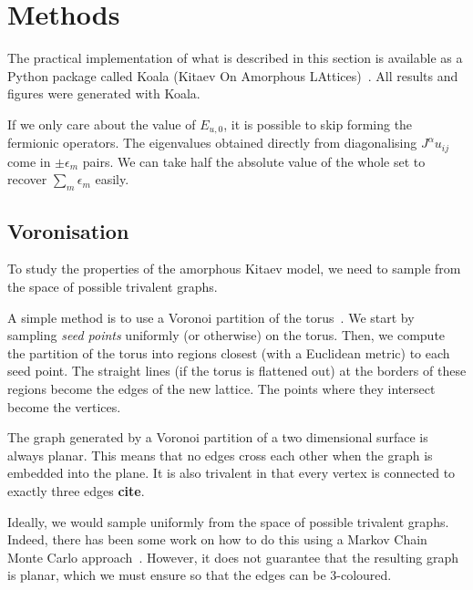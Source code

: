 \begin{lstlisting}[language=Python]
\end{lstlisting}

\hypertarget{amk-methods}{%
\section{Methods}\label{amk-methods}}

The practical implementation of what is described in this section is available as a Python package called Koala (Kitaev On Amorphous LAttices)~\autocite{hodsonKoalaKitaevAmorphous2022}. All results and figures were generated with Koala.

If we only care about the value of \(E_{u,0}\), it is possible to skip forming the fermionic operators. The eigenvalues obtained directly from diagonalising \(J^{\alpha} u_{ij}\) come in \(\pm \epsilon_m\) pairs. We can take half the absolute value of the whole set to recover \(\sum_m \epsilon_m\) easily.

\hypertarget{voronisation}{%
\subsection{Voronisation}\label{voronisation}}

To study the properties of the amorphous Kitaev model, we need to sample from the space of possible trivalent graphs.

A simple method is to use a Voronoi partition of the torus~\autocite{mitchellAmorphousTopologicalInsulators2018,marsalTopologicalWeaireThorpeModels2020,florescu_designer_2009}. We start by sampling \emph{seed points} uniformly (or otherwise) on the torus. Then, we compute the partition of the torus into regions closest (with a Euclidean metric) to each seed point. The straight lines (if the torus is flattened out) at the borders of these regions become the edges of the new lattice. The points where they intersect become the vertices.

The graph generated by a Voronoi partition of a two dimensional surface is always planar. This means that no edges cross each other when the graph is embedded into the plane. It is also trivalent in that every vertex is connected to exactly three edges \textbf{cite}.

Ideally, we would sample uniformly from the space of possible trivalent graphs. Indeed, there has been some work on how to do this using a Markov Chain Monte Carlo approach~\autocite{alyamiUniformSamplingDirected2016}. However, it does not guarantee that the resulting graph is planar, which we must ensure so that the edges can be 3-coloured.

